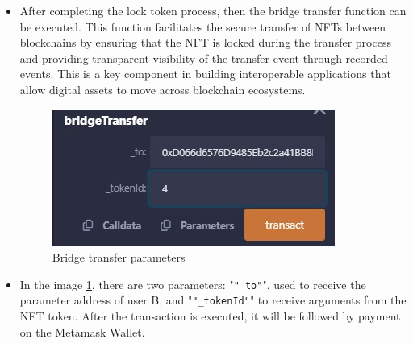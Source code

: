 \begin{itemize}
    \item After completing the lock token process, then the bridge transfer function can be executed. This function facilitates the secure transfer of NFTs between blockchains by ensuring that the NFT is locked during the transfer process and providing transparent visibility of the transfer event through recorded events. This is a key component in building interoperable applications that allow digital assets to move across blockchain ecosystems.

    \begin{figure} [H] \centering
    \includegraphics[scale=0.5  ]{gambar/bridge_transfer.jpeg}
    \caption{Bridge transfer parameters}
    \label{fig:bridge_transfer}
    \end{figure}

    \item In the image \ref{fig:bridge_transfer}, there are two parameters: "\texttt{"\_to"}", used to receive the parameter address of user B, and "\texttt{"\_tokenId"}" to receive arguments from the NFT token. After the transaction is executed, it will be followed by payment on the Metamask Wallet.


\end{itemize}
